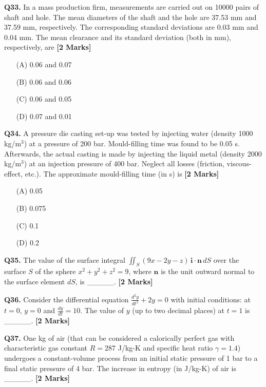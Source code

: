 \documentclass[11pt]{article}
\newcommand{\questionb}[2]{
    \noindent\textbf{Q#2.} #1 \hfill \textbf{[2 Marks]}
}
\begin{document}
\questionb{In a mass production firm, measurements are carried out on 10000 pairs of shaft and hole. The mean diameters of the shaft and the hole are 37.53 mm and 37.59 mm, respectively. The corresponding standard deviations are 0.03 mm and 0.04 mm. The mean clearance and its standard deviation (both in mm), respectively, are}{33}
\begin{enumerate}
    \item[(A)] 0.06 and 0.07
    \item[(B)] 0.06 and 0.06
    \item[(C)] 0.06 and 0.05
    \item[(D)] 0.07 and 0.01
\end{enumerate}
\vspace{0.5cm}

\questionb{A pressure die casting set-up was tested by injecting water (density 1000 kg/m\(^3\)) at a pressure of 200 bar. Mould-filling time was found to be 0.05 s. Afterwards, the actual casting is made by injecting the liquid metal (density 2000 kg/m\(^3\)) at an injection pressure of 400 bar. Neglect all losses (friction, viscous-effect, etc.). The approximate mould-filling time (in s) is}{34}
\begin{enumerate}
    \item[(A)] 0.05
    \item[(B)] 0.075
    \item[(C)] 0.1
    \item[(D)] 0.2
\end{enumerate}
\vspace{0.5cm}

\questionb{The value of the surface integral \( \iint_S (9x - 2y - z)\, \mathbf{i} \cdot \mathbf{n} \, dS \) over the surface \( S \) of the sphere \( x^2 + y^2 + z^2 = 9 \), where \( \mathbf{n} \) is the unit outward normal to the surface element \( dS \), is \_\_\_\_\_.}{35}
\vspace{0.5cm}

\questionb{Consider the differential equation \( \frac{d^2y}{dt^2} + 2y = 0 \) with initial conditions: at \( t = 0 \), \( y = 0 \) and \( \frac{dy}{dt} = 10 \). The value of \( y \) (up to two decimal places) at \( t = 1 \) is \_\_\_\_\_.}{36}
\vspace{0.5cm}

\questionb{One kg of air (that can be considered a calorically perfect gas with characteristic gas constant \( R = 287 \) J/kg-K and specific heat ratio \( \gamma = 1.4 \)) undergoes a constant-volume process from an initial static pressure of 1 bar to a final static pressure of 4 bar. The increase in entropy (in J/kg-K) of air is \_\_\_\_\_.}{37}
\vspace{0.5cm}
\end{document}

